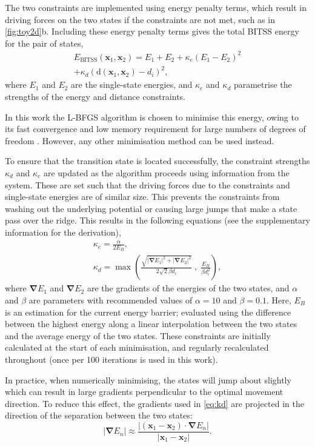 \documentclass[twocolumn,10pt]{revtex4}
\newcommand{\abs}[1]{\left| #1 \right|}
\newcommand{\grad}{\bm{\nabla}}
\begin{document}
The two constraints are implemented using energy penalty terms, which result in driving forces on the two states if the constraints are not met, such as in \cref{fig:toy2d}b.
Including these energy penalty terms gives the total BITSS energy for the pair of states,
\begin{multline}\label{eq:bitss}
  E_\text{BITSS}(\bm{x}_1, \bm{x}_2) = E_1 + E_2
    + \kappa_e \left( E_1 - E_2 \right) ^2 \\
    + \kappa_d \left( \mathrm{d}(\bm{x}_1, \bm{x}_2) - d_i \right) ^2,
\end{multline}
where $E_1$ and $E_2$ are the single-state energies, and $\kappa_e$ and $\kappa_d$ parametrise the strengths of the energy and distance constraints.

In this work the L-BFGS algorithm is chosen to minimise this energy, owing to its fast convergence and low memory requirement for large numbers of degrees of freedom \cite{Liu1989}.
However, any other minimisation method can be used instead.

To ensure that the transition state is located successfully, the constraint strengths $\kappa_d$ and $\kappa_e$ are updated as the algorithm proceeds using information from the system.
These are set such that the driving forces due to the constraints and single-state energies are of similar size.
This prevents the constraints from washing out the underlying potential or causing large jumps that make a state pass over the ridge.
This results in the following equations (see the supplementary information for the derivation),
\begin{gather}
  \kappa_e = \frac {\alpha} {2 E_B},
  \label{eq:ke}
  \\
  \kappa_d = \max \left(
    \frac {\sqrt{\abs{\grad E_1}^2 + \abs{\grad E_2}^2}} {2\sqrt{2} \beta d_i} \; , \;
    \frac{E_B}{\beta d_i^2} \right),
  \label{eq:kd}
\end{gather}
where $\grad E_1$ and $\grad E_2$ are the gradients of the energies of the two states, and $\alpha$ and $\beta$ are parameters with recommended values of $\alpha = 10$ and $\beta = 0.1$.
Here, $E_B$ is an estimation for the current energy barrier; evaluated using the difference between the highest energy along a linear interpolation between the two states and the average energy of the two states.
These constraints are initially calculated at the start of each minimisation, and regularly recalculated throughout (once per 100 iterations is used in this work).

In practice, when numerically minimising, the states will jump about slightly which can result in large gradients perpendicular to the optimal movement direction.
To reduce this effect, the gradients used in \cref{eq:kd} are projected in the direction of the separation between the two states:
\begin{equation}
  \abs{\grad E_n} \approx \frac {\abs{(\bm{x}_1 - \bm{x}_2) \cdot \grad E_n}} {\abs{\bm{x}_1 - \bm{x}_2}}.
\end{equation}
\end{document}
